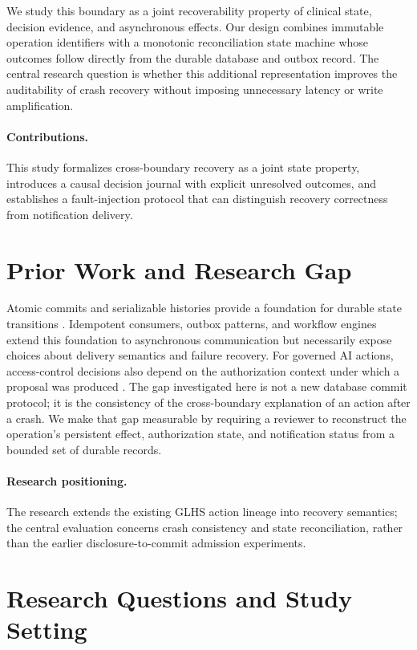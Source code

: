 \documentclass[11pt,a4paper]{article}
\begin{document}
We study this boundary as a joint recoverability property of clinical state, decision evidence, and asynchronous effects. Our design combines immutable operation identifiers with a monotonic reconciliation state machine whose outcomes follow directly from the durable database and outbox record. The central research question is whether this additional representation improves the auditability of crash recovery without imposing unnecessary latency or write amplification.

\paragraph{Contributions.} This study formalizes cross-boundary recovery as a joint state property, introduces a causal decision journal with explicit unresolved outcomes, and establishes a fault-injection protocol that can distinguish recovery correctness from notification delivery.

\section{Prior Work and Research Gap}
Atomic commits and serializable histories provide a foundation for durable state transitions \cite{kung1981,herlihy1990}. Idempotent consumers, outbox patterns, and workflow engines extend this foundation to asynchronous communication but necessarily expose choices about delivery semantics and failure recovery. For governed AI actions, access-control decisions also depend on the authorization context under which a proposal was produced \cite{sandhu1996,hu2014}. The gap investigated here is not a new database commit protocol; it is the consistency of the cross-boundary explanation of an action after a crash. We make that gap measurable by requiring a reviewer to reconstruct the operation's persistent effect, authorization state, and notification status from a bounded set of durable records.

\paragraph{Research positioning.} The research extends the existing GLHS action lineage into recovery semantics; the central evaluation concerns crash consistency and state reconciliation, rather than the earlier disclosure-to-commit admission experiments.

\section{Research Questions and Study Setting}
\end{document}
